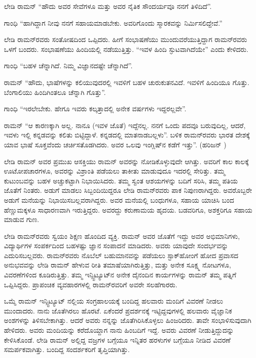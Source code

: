 ಲೇಡಿ ರಾಮನ್ \enginline{--} “ಹೌದು ಅವರ ಸೇವೆಗಳೂ ಮತ್ತು ಅವರ ನೈತಿಕ ಸೌಂದರ್ಯವೂ ನನಗೆ ತಿಳಿದಿದೆ”.

ಗಾಂಧಿ \enginline{--} “ಹಾಗಿದ್ದಾಗ ನೀವು ನನಗೆ ಸಹಾಯಮಾಡಬೇಕು. ಅವರಿಗೊಂದು ಸ್ಮಾರಕವನ್ನು ನಿರ್ಮಿಸಲಿದ್ದೇವೆ.”

ಲೇಡಿ ರಾಮನ್‍ರವರು ಸಂತೋಷದಿಂದ ಒಪ್ಪಿದರು. ಹೀಗೆ ಸಂಭಾಷಣೆಯು ಮುಂದುವರೆಯು\-ತ್ತಿದ್ದಾಗ ರಾಮನ್‍ರವರು ಒಳಗೆ ಬಂದರು. ಸಂಭಾಷಣೆಯು ಹಿಂದಿಯಲ್ಲಿ ನಡೆಯುತ್ತಿತ್ತು. “ಇವಳ ಹಿಂದಿ ಸ್ಫುಟವಾಗಿದೆಯೇ” ಎಂದು ಕೇಳಿದರು.

ಗಾಂಧಿ \enginline{--} “ಬಹಳ ಚೆನ್ನಾಗಿದೆ. ನಿಮ್ಮ ವಿಜ್ಞಾನದಷ್ಟೇ ಚೆನ್ನಾಗಿದೆ”.

ರಾಮನ್ \enginline{--} “ಹೌದು, ಭಾಷೆಗಳನ್ನು ಕಲಿಯುವುದರಲ್ಲಿ ಇವಳಿಗೆ ಬಹಳ ಚುರುಕುತನವಿದೆ. ಇವಳಿಗೆ ಹಿಂದಿಯೂ ಗೊತ್ತು. ಬೆಂಗಾಲಿಯು ಹಿಂದಿಗಿಂತಲೂ ಚೆನ್ನಾಗಿ ಗೊತ್ತು”.

ಗಾಂಧಿ \enginline{--} “ಇರಲೇಬೇಕು. ಹೇಗೂ ಇವರು ಕಲ್ಕತ್ತಾದಲ್ಲಿ ಅನೇಕ ವರ್ಷಗಳು ಇದ್ದರಲ್ಲವೇ”.

ರಾಮನ್ \enginline{--} “ಆ ಕಾರಣಕ್ಕಾಗಿ ಅಲ್ಲ. ನಾನೂ (ಇವಳ ಜೊತೆ) ಇದ್ದೆನಲ್ಲ. ನನಗೆ ಒಂದು ಪದವೂ ಬರುವುದಿಲ್ಲ, ಆದರೆ, ಇವಳು ಇಲ್ಲಿ ಕನ್ನಡವನ್ನು ಕಲಿತು ಬಿಟ್ಟಿದ್ದಾಳೆ. ಕನ್ನಡದಲ್ಲಿ ಮಾತನಾಡಬಲ್ಲಳು”. ಬಳಿಕ ರಾಮನ್‍ರವರು ಭಾರತ ದೇಶಕ್ಕೆ ಯಾವ ಭಾಷೆ ಸೂಕ್ತವೆಂದು ಚರ್ಚಿಸತೊಡಗಿದರು. ಅವರ ಒಲವು ಇಂಗ್ಲಿಷ್‍ನ ಕಡೆಗೆ ಇತ್ತು”. (ಹರಿಜನ್ )

\newpage

ಲೇಡಿ ರಾಮನ್ ಅವರ ಪ್ರಮುಖ ಆಸಕ್ತಿಯು ರಾಮನ್ ಅವರನ್ನು ನೋಡಿಕೊಳ್ಳುವುದೇ ಆಗಿತ್ತು. ಅವರಿಗೆ ಕಾಲ ಕಾಲಕ್ಕೆ ಊಟೋಪಚಾರಗಳೂ, ಅವರನ್ನು ವಿಶ್ರಾಂತಿ ಪಡೆಯಲು ತಾಕೀತು ಮಾಡುವುದೂ ಇದರಲ್ಲಿ ಸೇರಿತ್ತು. ತಮ್ಮ ಕುಟುಂಬವನ್ನು ಬಹಳ ಅಚ್ಚುಕಟ್ಟಾಗಿ ನಿಭಾಯಿಸಿದರು. ತಮ್ಮ ಸ್ವಂತ ಆಶಯಗಳನ್ನು ಬದಿಗೆ ಸರಿಸಿ, ತಮ್ಮ ಪತಿಯ ಜೊತೆಗೆ ನಿಂತರು. ಅಡುಗೆ ಮಾಡಲು ಸಿಬ್ಬಂದಿಯಿದ್ದರೂ ಲೇಡಿ ರಾಮನ್‍ರವರು ಪಾಕ ನಿಪುಣರಾಗಿದ್ದರು. ಅವರೊಬ್ಬರೇ ಅಡುಗೆ ಮನೆಯನ್ನು ನಿಭಾಯಿಸಬಲ್ಲವರಾಗಿದ್ದರು. ಅವರ ಮನೆಯಲ್ಲಿ ಬಂಧುಗಳೂ, ಸಹಾಯ ಯಾಚಿಸಿ ಬಂದ ಹೆಣ್ಣುಮಕ್ಕಳೂ ಸಾಧಾರಣವಾಗಿ ಇರುತ್ತಿದ್ದರು. ಅವರದ್ದು ಕರುಣಾಮಯ ಹೃದಯ. ಬಡವರಿಗೂ, ಅಶಕ್ತರಿಗೂ ಸಹಾಯ ಮಾಡುವ ಗುಣ.

ಲೇಡಿ ರಾಮನ್‍ರವರು ಸ್ವಯಂ ಶಿಕ್ಷಣ ಹೊಂದಿದ ವ್ಯಕ್ತಿ. ರಾಮನ್ ಅವರ ಜೊತೆಗೆ ಇದ್ದು ಅವರ ಅಭಿಮಾನಿಗಳು, ವಿದ್ಯಾರ್ಥಿಗಳ ಸಂಪರ್ಕದಿಂದ ಬಹಳಷ್ಟು ಜ್ಞಾನ ಸಂಪಾದನೆ ಮಾಡಿದರು. ಅವರು ಯಾವುದೇ ಸಂದರ್ಭವನ್ನು ಎದುರಿಸಬಲ್ಲವರು. ರಾಮನ್‍ರವರು ನೊಬೆಲ್ ಬಹುಮಾನವನ್ನು ಪಡೆಯಲು ಸ್ಟಾಕ್‌ಹೋಂಗೆ ಹೋದ ಪ್ರವಾಸದ ಅನುಭವವನ್ನು ಲೇಡಿ ರಾಮನ್ ಹೇಳುವ ರೀತಿ ತಮಾಷೆಯಾಗಿರುತ್ತಿತ್ತು, ಮತ್ತು ಅನೇಕ ಸೂಕ್ಷ್ಮ ನೋಟಗಳೂ, ವಿವರಣೆಗಳಿಂದ ಕೂಡಿರುತ್ತಿತ್ತು. ತಮ್ಮ ಇನ್ಸ್ಟಿಟ್ಯೂಟ್‍ನ ಅನೇಕ ದೈನಂದಿನ ಕಾರ್ಯಗಳನ್ನು ರಾಮನ್ ತಮ್ಮ ಪತ್ನಿಗೆ ಒಪ್ಪಿಸಿದ್ದರು. ಪ್ರಾಪಂಚಿಕ ವ್ಯವಹಾರಗಳಲ್ಲಿ ರಾಮನ್‍ರವರಿಗೆ ಅವರೇ ಸಲಹೆಗಾರರು.

ಒಮ್ಮೆ ರಾಮನ್ ಇನ್ಸ್ಟಿಟ್ಯೂಟ್ ನಲ್ಲಿಯ ಸಂಗ್ರಹಾಲಯಕ್ಕೆ ಬಂದಿದ್ದ ಹಲವಾರು ಮಂದಿಗೆ ವಿವರಣೆ ನೀಡಲು ಮುಂದಾದರು. ನಾನು ಜೊತೆಗಿರಲು ಹೊರಟೆ. ಏಕೆಂದರೆ ಪ್ರದರ್ಶನಕ್ಕೆ ಇಟ್ಟಿದ್ದವು\-ಗಳಲ್ಲಿ ಹಲವಾರು ವೈಜ್ಞಾನಿಕ ಅಂಶಗಳನ್ನು ತಿಳಿಸಬೇಕಾಗಿತ್ತು. ಆದರೆ ಅವರು ನನ್ನನ್ನು ಜೊತೆಗಿರಿಸಿಕೊಳ್ಳಲು ಹಿಂಜರಿದರು. ತಾವೇ ಸಂಭಾಳಿಸುವುದಾಗಿ ಹೇಳಿದರು. ಅವರು ಮಂದಿಯನ್ನು ಕರೆದೊಯ್ದಾಗ ನಾನು ಹಿಂಬದಿಗೆ ಇದ್ದೆ. ಅವರು ವಿವರಣೆ ನೀಡುತ್ತಿದ್ದುದನ್ನು ಕೇಳಿಸಿಕೊಂಡೆ. ಲೇಡಿ ರಾಮನ್ ಅಲ್ಲಿದ್ದ ವಜ್ರಗಳ ಬಗ್ಗೆಯೂ ಇನ್ನಿತರ ಹರಳುಗಳ ಬಗ್ಗೆಯೂ ನೀಡಿದ ವಿವರಣೆ ಸಮರ್ಪಕವಾಗಿತ್ತು. ಬಂದಿದ್ದ ಸಂದರ್ಶಕರಿಗೆ ತೃಪ್ತಿಯಾಗಿತ್ತು.

